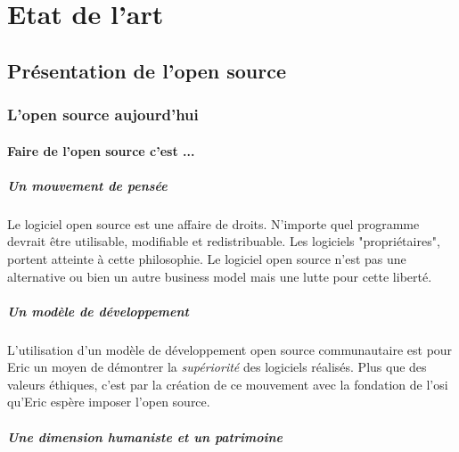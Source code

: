 \chapter{Etat de l'art} %


	\section{Présentation de l'open source} %

		\subsection{L'open source aujourd'hui}

			\subsubsection{Faire de l'open source c'est ...}

				\paragraph{Un mouvement de pensée\\}

					Le logiciel open source est une affaire de droits. N'importe quel programme devrait être utilisable, modifiable et redistribuable. Les logiciels "propriétaires", portent atteinte à cette philosophie. Le logiciel open source n'est pas une alternative ou bien un autre business model mais une lutte pour cette liberté.

				\paragraph{Un modèle de développement\\}

					L'utilisation d'un modèle de développement open source communautaire est pour Eric  un moyen de démontrer la \textit{supériorité} des logiciels réalisés. Plus que des valeurs éthiques, c'est par la création de ce mouvement avec la fondation de l'\acrshort{osi} qu'Eric  espère imposer l'open source.

				\paragraph{Une dimension humaniste et un patrimoine\\}


